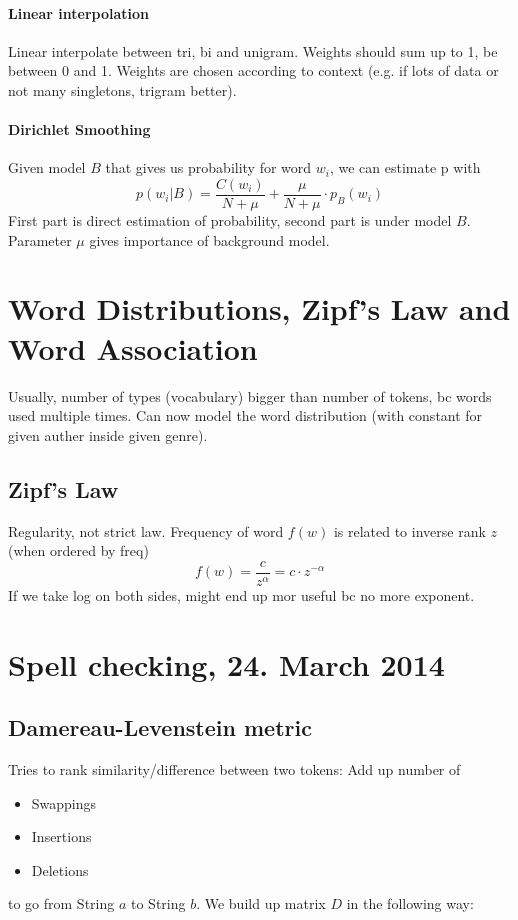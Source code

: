 \documentclass[11pt]{article}
\begin{document}
\paragraph{Linear interpolation}
Linear interpolate between tri, bi and unigram. Weights should sum up to 1, be between 0 and 1.
Weights are chosen according to context (e.g. if lots of data or not many singletons, trigram better). 
\paragraph{Dirichlet Smoothing}
Given model $B$ that gives us probability for word $w_i$, we can estimate p with
\begin{equation}
	p(w_i|B) = \frac{C(w_i)}{N + \mu} + \frac{\mu}{N + \mu}\cdot p_B(w_i)
\end{equation}
First part is direct estimation of probability, second part is under model $B$. Parameter $\mu$ gives
importance of background model.

\section{Word Distributions, Zipf's Law and Word Association}
Usually, number of types (vocabulary) bigger than number of tokens, bc words used multiple times.
Can now model the word distribution (with constant for given auther inside given genre).
\subsection{Zipf's Law}
Regularity, not strict law. Frequency of word $f(w)$ is related to inverse rank $z$ (when ordered by freq)
\begin{equation}
	f(w) = \frac{c}{z^\alpha} = c \cdot z^{-\alpha}
\end{equation}
If we take log on both sides, might end up mor useful bc no more exponent.
\section{Spell checking, 24. March 2014}

\subsection{Damereau-Levenstein metric}
\label{sub:levenstein}
Tries to rank similarity/difference between two tokens: Add up number of
\begin{itemize}
	\item Swappings
	\item Insertions
	\item Deletions
\end{itemize}
to go from String $a$ to String $b$. We build up matrix $D$ in the following way:
\end{document}
